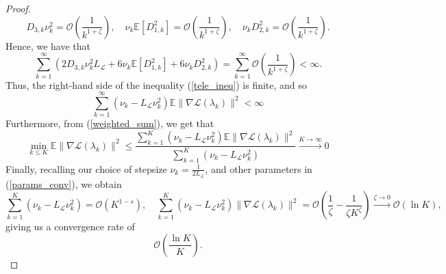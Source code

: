\documentclass[11pt, twoside]{report}
\begin{document}
\begin{proof}
$$D_{3,k}\nu_k^2 = \mathcal{O}\left(\frac{1}{k^{1+\zeta}}\right), \quad \nu_k\mathbb{E}[D_{1,k}^2] = \mathcal{O}\left(\frac{1}{k^{1+\zeta}} \right), \quad \nu_k D_{2,k}^2 = \mathcal{O}\left(\frac{1}{k^{1+\zeta}} \right).$$
Hence, we have that 
\[\sum_{k=1}^\infty \left(2D_{3,k}\nu_k^2 L_{\mathcal{L}} + 6\nu_k\mathbb{E}[D_{1,k}^2] + 6\nu_kD_{2,k}^2\right) = \sum_{k=1}^\infty \mathcal{O}\left(\frac{1}{k^{1+\zeta}}\right) < \infty.\]
Thus, the right-hand side of the inequality (\ref{tele_ineq}) is finite, and so
\begin{equation} \label{weighted_sum}
    \sum_{k=1}^\infty (\nu_k - L_{\mathcal{L}}\nu_k^2)\mathbb{E}\|\nabla\mathcal{L}(\lambda_k)\|^2 < \infty
\end{equation}
Furthermore, from (\ref{weighted_sum}), we get that
\[\min_{k \leq K} \mathbb{E}\|\nabla \mathcal{L}(\lambda_k)\|^2 \leq \frac{\sum_{k=1}^K (\nu_k - L_{\mathcal{L}}\nu_k^2)\mathbb{E}\|\nabla\mathcal{L}(\lambda_k)\|^2}{\sum_{k=1}^K (\nu_k - L_{\mathcal{L}}\nu_k^2)} \xrightarrow[]{K \to \infty} 0\]
Finally, recalling our choice of stepsize $\nu_k = \frac{1}{2L_\mathcal{L}}$, and other parameters in (\ref{params_conv}), we obtain
\[\sum_{k=1}^K (\nu_k - L_{\mathcal{L}}\nu_k^2) = \mathcal{O} \left(K^{1-s} \right), \quad \sum_{k=1}^K (\nu_k - L_{\mathcal{L}}\nu_k^2)\|\nabla\mathcal{L}(\lambda_k)\|^2 = \mathcal{O} \left(\frac{1}{\zeta} - \frac{1}{\zeta K^\zeta} \right) \xrightarrow[]{\zeta \to 0} \mathcal{O}\left(\ln{K} \right),\]
giving us a convergence rate of
\[\mathcal{O} \left(\frac{\ln{K}}{K} \right).\]

\end{proof}
\end{document}

